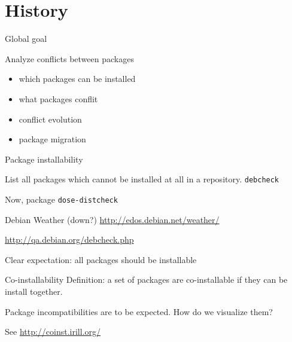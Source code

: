 \documentclass[xcolor={dvipsnames}]{beamer}
\begin{document}
\part{History}
\frame{\partpage}

\begin{frame}{Global goal}

Analyze conflicts between packages
\begin{itemize}
\item which packages can be installed
\item what packages conflit
\item conflict evolution
\item package migration
\end{itemize}

\end{frame}

\begin{frame}{Package installability}

List all packages which cannot be installed at all in a repository.
\texttt{debcheck}

Now, package \texttt{dose-distcheck}

Debian Weather (down?)
\url{http://edos.debian.net/weather/}

\url{http://qa.debian.org/debcheck.php}

Clear expectation: all packages should be installable

\end{frame}

\begin{frame}[fragile]{Co-installability}
Definition: a set of packages are co-installable if they can be install
together.

Package incompatibilities  are to be expected.
%
How do we visualize them?

See \url{http://coinst.irill.org/}
\end{frame}
\end{document}
